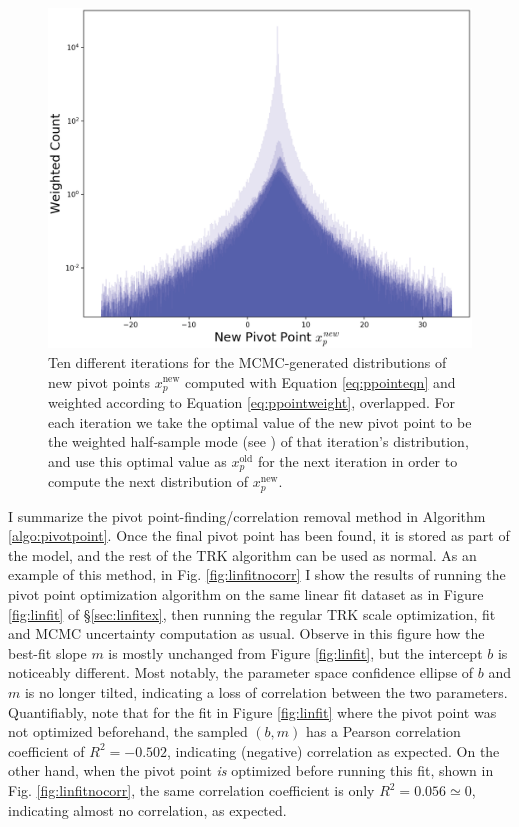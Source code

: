 \begin{figure}
    \centering
    \includegraphics[width=0.8\linewidth]{figures/pivotpointdist.eps}
    \caption{Ten different iterations for the MCMC-generated distributions of new pivot points $x_p^\text{new}$ computed with Equation \eqref{eq:ppointeqn} and weighted according to Equation \eqref{eq:ppointweight}, overlapped. For each iteration we take the optimal value of the new pivot point to be the weighted half-sample mode (see \textcite{bickel2005fast}) of that iteration's distribution, and use this optimal value as $x_p^\text{old}$ for the next iteration in order to compute the next distribution of $x_p^\text{new}$.}
    \label{fig:ppointiters}
\end{figure}

I summarize the pivot point-finding/correlation removal method in Algorithm \ref{algo:pivotpoint}. Once the final pivot point has been found, it is stored as part of the model, and the rest of the TRK algorithm can be used as normal. As an example of this method, in Fig. \ref{fig:linfitnocorr} I show the results of running the pivot point optimization algorithm on the same linear fit dataset as in Figure \ref{fig:linfit} of \S\ref{sec:linfitex}, then running the regular TRK scale optimization, fit and MCMC uncertainty computation as usual. Observe in this figure how the best-fit slope $m$ is mostly unchanged from Figure \ref{fig:linfit}, but the intercept $b$ is noticeably different. Most notably, the parameter space confidence ellipse of $b$ and $m$ is no longer tilted, indicating a loss of correlation between the two parameters. Quantifiably, note that for the fit in Figure \ref{fig:linfit} where the pivot point was not optimized beforehand, the sampled $(b,m)$ has a Pearson correlation coefficient of $R^2 = -0.502$, indicating (negative) correlation as expected. On the other hand, when the pivot point \textit{is} optimized before running this fit, shown in Fig. \ref{fig:linfitnocorr}, the same correlation coefficient is only $R^2=0.056\simeq 0$, indicating almost no correlation, as expected.

